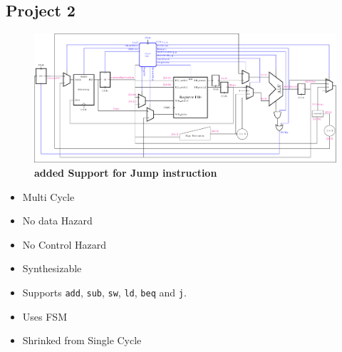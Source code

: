 \documentclass{article}
\begin{document}
\subsection*{Project 2}
\begin{figure}[H]
    \begin{center}
        \includegraphics[scale=0.74]{MultiCycleImplementation/TexFiles/MultiCycle2.pdf}
        \caption*{\textbf{added Support for Jump instruction}}
    \end{center}
\end{figure}
\begin{itemize}
    \item Multi Cycle
    \item No data Hazard
    \item No Control Hazard
    \item Synthesizable
    \item Supports \verb|add|, \verb|sub|, \verb|sw|, \verb|ld|, \verb|beq| and \verb|j|.
    \item Uses FSM
    \item Shrinked from Single Cycle
\end{itemize}
\end{document}
